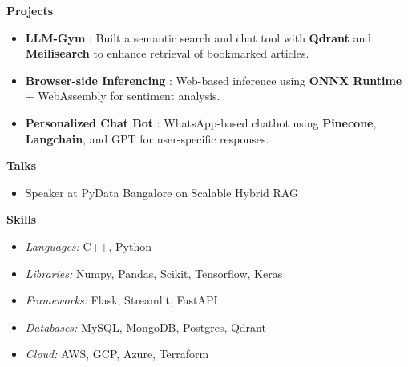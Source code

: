 \documentclass{article}%
\begin{document}
\begin{flushleft}
\bf{\Large{Projects}}
\end{flushleft}
\vspace{-2mm}
\hline
\begin{itemize}
\setlength\itemsep{0.01em}
\item \textbf{LLM-Gym} : Built a semantic search and chat tool with \textbf{Qdrant} and \textbf{Meilisearch} to enhance retrieval of bookmarked articles.\hfill
\href{https://github.com/RheagalFire/LLM-gym/tree/main/gym_reader}{\faGithub}\hspace{2mm}\href{https://www.linkedin.com/posts/aarish-alam_rag-dspy-knowledgemanagement-activity-7288050529685975042-uNUi?utm_source=share&utm_medium=member_desktop&rcm=ACoAAC3guzgBLJ3ujDvj7NqMMjTw1_2SwpYn4dE}{\faLinkedin}

\item \textbf{Browser-side Inferencing} : Web-based inference using \textbf{ONNX Runtime} + WebAssembly for sentiment analysis.\hfill
\href{https://github.com/RheagalFire/Browserside-Inferencing}{\faGithub}

\item \textbf{Personalized Chat Bot} : WhatsApp-based chatbot using \textbf{Pinecone}, \textbf{Langchain}, and GPT for user-specific responses.\hfill
\href{https://github.com/RheagalFire/personalized_chat_bot}{\faGithub}
\end{itemize}

\begin{flushleft}
\bf{\Large{Talks}}
\end{flushleft}
\vspace{-1mm}
\hline
\begin{itemize}
\item Speaker at PyData Bangalore on Scalable Hybrid RAG\hfill
\href{https://www.linkedin.com/posts/pydata-bangalore_pydata-bangalore-machinelearning-activity-7298222664903495680-XK4G?utm_source=share&utm_medium=member_desktop&rcm=ACoAAC3guzgBLJ3ujDvj7NqMMjTw1_2SwpYn4dE}{\faLinkedin}\hspace{2mm}
\href{https://github.com/RheagalFire/Scalable-Hybrid-Rag}{\faGithub}\hspace{2mm}
\href{https://docs.google.com/presentation/d/1a6ENOwzwmHTZ1k66ErT51CDKL4EksXiEYehhHRsKwWU/edit?usp=sharing}{\faFilePowerpoint}
\end{itemize}

\begin{flushleft}
\bf{\Large{Skills}}
\end{flushleft}
\vspace{-1mm}
\hline
\begin{itemize}
\setlength\itemsep{0.01em}
\item \textit{Languages:} C++, Python
\item \textit{Libraries:} Numpy, Pandas, Scikit, Tensorflow, Keras
\item \textit{Frameworks:} Flask, Streamlit, FastAPI
\item \textit{Databases:} MySQL, MongoDB, Postgres, Qdrant
\item \textit{Cloud:} AWS, GCP, Azure, Terraform
\end{itemize}
\end{document}
